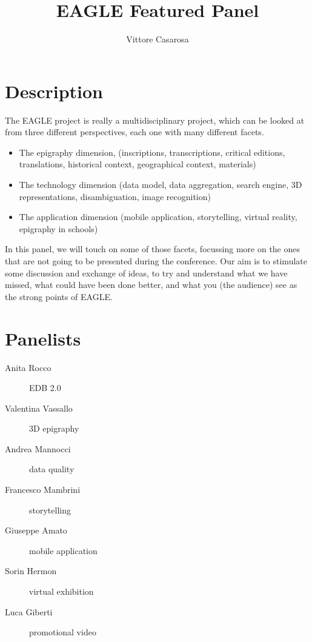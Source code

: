 \documentclass[amsthm,ebook]{saparticle}
\title{EAGLE Featured Panel}
\author[ISTI]{Vittore Casarosa\corref{first}}
\begin{document}
\maketitle


\section{Description}
The EAGLE project is really a multidisciplinary project,
which can be looked at from three different perspectives,
each one with many different facets.
\begin{itemize}
\item The epigraphy dimension, (inscriptions, transcriptions,
critical editions, translations, historical context,
geographical context, materials)
\item  The technology dimension (data model, data aggregation,
search engine, 3D representations, disambiguation,
image recognition)
\item  The application dimension (mobile application,
storytelling, virtual reality, epigraphy in schools)
\end{itemize}


In this panel, we will touch on some of those facets,
focussing more on the ones that are not going to be
presented during the conference. Our aim is to stimulate
some discussion and exchange of ideas, to try and
understand what we have missed, what could have been
done better, and what you (the audience) see as the
strong points of EAGLE.

\section{Panelists}
\begin{description}
\item[Anita Rocco] EDB 2.0
\item[Valentina Vassallo] 3D epigraphy
\item[Andrea Mannocci] data quality
\item[Francesco Mambrini] storytelling
\item[Giuseppe Amato] mobile application
\item[Sorin Hermon] virtual exhibition
\item[Luca Giberti] promotional video
\end{description}
\end{document}

